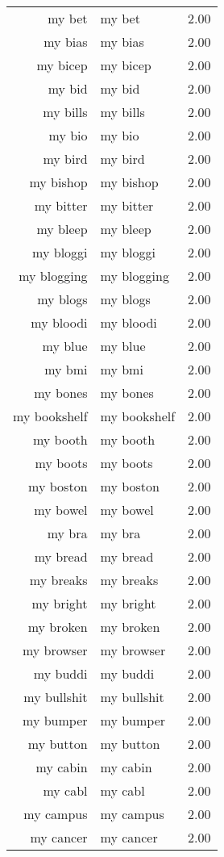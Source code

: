 \begin{table}[ht]
\begin{tabular}{rlr}
  my bet & my bet & 2.00 \\ 
  my bias & my bias & 2.00 \\ 
  my bicep & my bicep & 2.00 \\ 
  my bid & my bid & 2.00 \\ 
  my bills & my bills & 2.00 \\ 
  my bio & my bio & 2.00 \\ 
  my bird & my bird & 2.00 \\ 
  my bishop & my bishop & 2.00 \\ 
  my bitter & my bitter & 2.00 \\ 
  my bleep & my bleep & 2.00 \\ 
  my bloggi & my bloggi & 2.00 \\ 
  my blogging & my blogging & 2.00 \\ 
  my blogs & my blogs & 2.00 \\ 
  my bloodi & my bloodi & 2.00 \\ 
  my blue & my blue & 2.00 \\ 
  my bmi & my bmi & 2.00 \\ 
  my bones & my bones & 2.00 \\ 
  my bookshelf & my bookshelf & 2.00 \\ 
  my booth & my booth & 2.00 \\ 
  my boots & my boots & 2.00 \\ 
  my boston & my boston & 2.00 \\ 
  my bowel & my bowel & 2.00 \\ 
  my bra & my bra & 2.00 \\ 
  my bread & my bread & 2.00 \\ 
  my breaks & my breaks & 2.00 \\ 
  my bright & my bright & 2.00 \\ 
  my broken & my broken & 2.00 \\ 
  my browser & my browser & 2.00 \\ 
  my buddi & my buddi & 2.00 \\ 
  my bullshit & my bullshit & 2.00 \\ 
  my bumper & my bumper & 2.00 \\ 
  my button & my button & 2.00 \\ 
  my cabin & my cabin & 2.00 \\ 
  my cabl & my cabl & 2.00 \\ 
  my campus & my campus & 2.00 \\ 
  my cancer & my cancer & 2.00 \\ 

\end{tabular}
\end{table}
